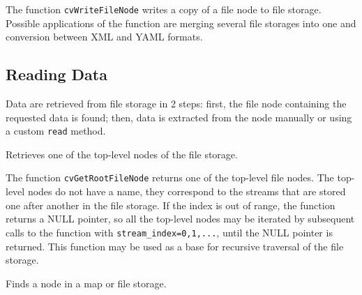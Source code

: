 The function \texttt{cvWriteFileNode} writes a copy of a file node to file storage. Possible applications of the function are merging several file storages into one and conversion between XML and YAML formats.

\subsection{Reading Data}

Data are retrieved from file storage in 2 steps: first, the file node
containing the requested data is found; then, data is extracted from
the node manually or using a custom \texttt{read} method.

\label{GetRootFileNode}

Retrieves one of the top-level nodes of the file storage.


\begin{description}
\end{description}

The function \texttt{cvGetRootFileNode} returns one of the top-level file
nodes. The top-level nodes do not have a name, they correspond to the
streams that are stored one after another in the file storage. If the
index is out of range, the function returns a NULL pointer, so all the
top-level nodes may be iterated by subsequent calls to the function with
\texttt{stream\_index=0,1,...}, until the NULL pointer is returned. This function
may be used as a base for recursive traversal of the file storage.

\label{GetFileNodeByName}

Finds a node in a map or file storage.


